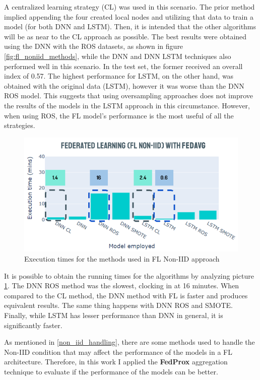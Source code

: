 A centralized learning strategy (CL) was used in this scenario. The prior method implied appending the four created local nodes and utilizing that data to train a model (for both DNN and LSTM). Then, it is intended that the other algorithms will be as near to the CL approach as possible. The best results were obtained using the DNN with the ROS datasets, as shown in figure \ref{fig:fl_noniid_methods}, while the DNN and DNN LSTM techniques also performed well in this scenario. In the test set, the former received an overall index of 0.57. The highest performance for LSTM, on the other hand, was obtained with the original data (LSTM), however it was worse than the DNN ROS model. This suggests that using oversampling approaches does not improve the results of the models in the LSTM approach in this circumstance. However, when using ROS, the FL model's performance is the most useful of all the strategies.

\begin{figure}[H]
\centering
\includegraphics[scale=0.6]{img/times_fl_noniid.png}
\caption{Execution times for the methods used in FL Non-IID approach}
\label{fig:times_fl_noniid}
\end{figure}

It is possible to obtain the running times for the algorithms by analyzing picture \ref{fig:times_fl_noniid}. The DNN ROS method was the slowest, clocking in at 16 minutes. When compared to the CL method, the DNN method with FL is faster and produces equivalent results. The same thing happens with DNN ROS and SMOTE. Finally, while LSTM has lesser performance than DNN in general, it is significantly faster.

As mentioned in \ref{non_iid_handling}, there are some methods used to handle the Non-IID condition that may affect the performance of the models in a FL architecture. Therefore, in this work I applied the \textbf{FedProx} aggregation technique to evaluate if the performance of the models can be better. 

